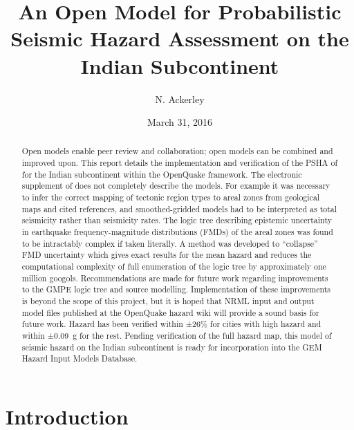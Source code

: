 \documentclass{article}
\begin{document}
\title{An Open Model for Probabilistic Seismic Hazard Assessment on the Indian Subcontinent}
\date{March 31, 2016}

\setcounter{Maxaffil}{0} %
\author[1,2]{N. Ackerley}

\maketitle

\begin{abstract}
Open models enable peer review and collaboration; open models can be combined and improved upon.
This report details the implementation and verification of the PSHA of \cite{nath2012probabilistic} for the Indian subcontinent within the OpenQuake framework.
The electronic supplement of \cite{nath2012probabilistic} does not completely describe the models.
For example it was necessary to infer the correct mapping of tectonic region types to areal zones from geological maps and cited references, and smoothed-gridded models had to be interpreted as total seismicity rather than seismicity rates.
The logic tree describing epistemic uncertainty in earthquake frequency-magnitude distributions (FMDs) of the areal zones was found to be intractably complex if taken literally.
A method was developed to ``collapse'' FMD uncertainty which gives exact results for the mean hazard and reduces the computational complexity of full enumeration of the logic tree by approximately one million googols.
Recommendations are made for future work regarding improvements to the GMPE logic tree and source modelling.
Implementation of these improvements is beyond the scope of this project, but it is hoped that NRML input and output model files published at the OpenQuake hazard wiki will provide a sound basis for future work.
Hazard has been verified within ±26\% for cities with high hazard and within ±0.09~g for the rest.
Pending verification of the full hazard map, this model of seismic hazard on the Indian subcontinent is ready for incorporation into the GEM Hazard Input Models Database.
\end{abstract}

\tableofcontents
\listoffigures
\listoftables

\section{Introduction}
\label{sec:Introduction}
\end{document}
